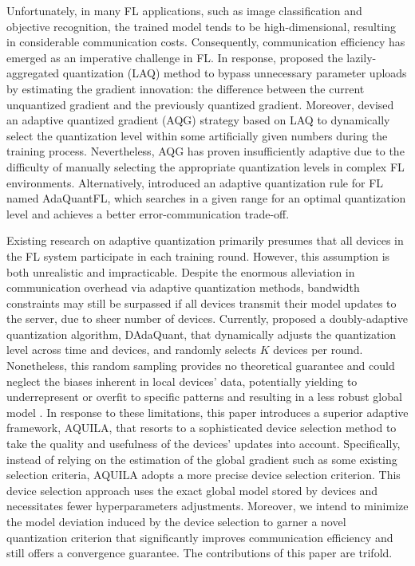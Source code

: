 \documentclass[lettersize,journal]{IEEEtran}
\begin{document}
Unfortunately, in many FL applications, such as image classification and objective recognition, the trained model tends to be high-dimensional, resulting in considerable communication costs. Consequently, communication efficiency has emerged as an imperative challenge in FL. In response, \cite{sun2020lazily} proposed the lazily-aggregated quantization (LAQ) method to bypass unnecessary parameter uploads by estimating the gradient innovation: the difference between the current unquantized gradient and the previously quantized gradient. 
Moreover, \cite{mao2021communication} devised an adaptive quantized gradient (AQG) strategy based on LAQ to dynamically select the quantization level within some artificially given numbers during the training process. Nevertheless, AQG has proven insufficiently adaptive due to the difficulty of manually selecting the appropriate quantization levels in complex FL environments.
Alternatively, \cite{jhunjhunwala2021adaptive} introduced an adaptive quantization rule for FL named AdaQuantFL, which searches in a given range for an optimal quantization level and achieves a better error-communication trade-off.

\IEEEpubidadjcol
Existing research on adaptive quantization primarily presumes that all devices in the FL system participate in each training round. However, this assumption is both unrealistic and impracticable. Despite the enormous alleviation in communication overhead via adaptive quantization methods, bandwidth constraints may still be surpassed if all devices transmit their model updates to the server, due to sheer number of devices. Currently, \cite{honig2022dadaquant} proposed a doubly-adaptive quantization algorithm, DAdaQuant, that dynamically adjusts the quantization level across time and devices, and randomly selects $K$ devices per round. Nonetheless, this random sampling provides no theoretical guarantee and could neglect the biases inherent in local devices' data, potentially yielding to underrepresent or overfit to specific patterns and resulting in a less robust global model \cite{cho2020client}. In response to these limitations, this paper introduces a superior adaptive framework, AQUILA, that resorts to a sophisticated device selection method to take the quality and usefulness of the devices' updates into account. Specifically, instead of relying on the estimation of the global gradient such as some existing selection criteria, AQUILA adopts a more precise device selection criterion. This device selection approach uses the exact global model stored by devices and necessitates fewer hyperparameters adjustments. Moreover, we intend to minimize the model deviation induced by the device selection to garner a novel quantization criterion that significantly improves communication efficiency and still offers a convergence guarantee. The contributions of this paper are trifold.
\end{document}
